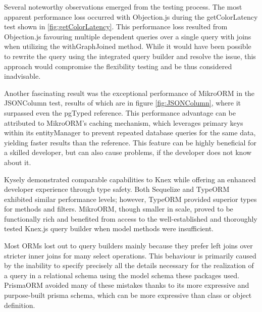 Several noteworthy observations emerged from the testing process. The most
apparent performance loss occurred with Objection.js during the getColorLatency
test shown in \ref{fig:getColorLatency}. This performance loss resulted from
Objection.js favouring multiple dependent queries over a single query with joins
when utilizing the withGraphJoined method. While it would have been possible to
rewrite the query using the integrated query builder and resolve the issue, this
approach would compromise the flexibility testing and be thus considered
inadvisable.

Another fascinating result was the exceptional performance of MikroORM in the
JSONColumn test, results of which are in figure \ref{fig:JSONColumn}, where it
surpassed even the pgTyped reference. This performance advantage can be
attributed to MikroORM's caching mechanism, which leverages primary keys within
its entityManager to prevent repeated database queries for the same data,
yielding faster results than the reference. This feature can be highly
beneficial for a skilled developer, but can also cause problems, if the
developer does not know about it.

Kysely demonstrated comparable capabilities to Knex while offering an enhanced
developer experience through type safety. Both Sequelize and TypeORM exhibited
similar performance levels; however, TypeORM provided superior types for methods
and filters. MikroORM, though smaller in scale, proved to be functionally rich
and benefited from access to the well-established and thoroughly tested Knex.js
query builder when model methods were insufficient.

Most ORMs lost out to query builders mainly because they prefer left joins over
stricter inner joins for many select operations. This behaviour is primarily
caused by the inability to specify precisely all the details necessary for the
realization of a query in a relational schema using the model schema these
packages used. PrismaORM avoided many of these mistakes thanks to its more
expressive and purpose-built prisma schema, which can be more expressive than
class or object definition.

